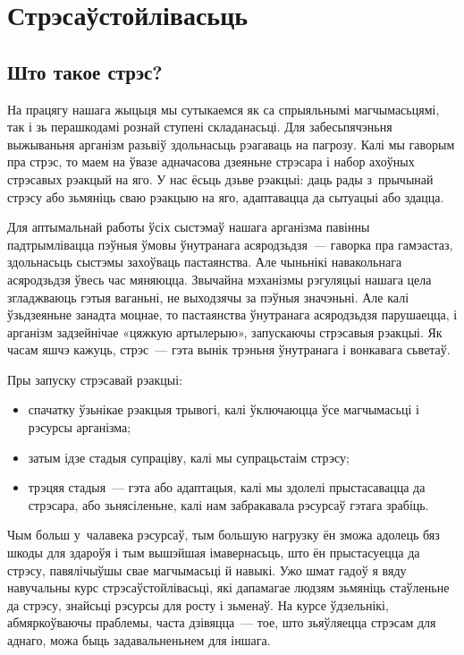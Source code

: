\chapter{Стрэсаўстойлівасьць}

\section{Што такое стрэс?}

На працягу нашага жыцьця мы сутыкаемся як са спрыяльнымі магчымасьцямі, так і зь перашкодамі рознай ступені складанасьці. Для забесьпячэньня выжываньня арганізм разьвіў здольнасьць рэагаваць на пагрозу. Калі мы гаворым пра стрэс, то маем на ўвазе адначасова дзеяньне стрэсара і набор ахоўных стрэсавых рэакцый на яго. У нас ёсьць дзьве рэакцыі: даць рады з~прычынай стрэсу або зьмяніць сваю рэакцыю на яго, адаптавацца да сытуацыі або здацца.

Для аптымальнай работы ўсіх сыстэмаў нашага арганізма павінны падтрымлівацца пэўныя ўмовы ўнутранага асяродзьдзя~--- гаворка пра гамэастаз, здольнасьць сыстэмы захоўваць пастаянства. Але чыньнікі навакольнага асяродзьдзя ўвесь час мяняюцца. Звычайна мэханізмы рэгуляцыі нашага цела згладжваюць гэтыя ваганьні, не выходзячы за пэўныя значэньні. Але калі ўзьдзеяньне занадта моцнае, то пастаянства ўнутранага асяродзьдзя парушаецца, і арганізм задзейнічае «цяжкую артылерыю», запускаючы стрэсавыя рэакцыі. Як часам яшчэ кажуць, стрэс~--- гэта вынік трэньня ўнутранага і вонкавага сьветаў.


Пры запуску стрэсавай рэакцыі: 
\begin{itemize}
  \item спачатку ўзьнікае рэакцыя трывогі, калі ўключаюцца ўсе магчымасьці і рэсурсы арганізма;
  \item затым ідзе стадыя супраціву, калі мы супрацьстаім стрэсу;
  \item трэцяя стадыя~--- гэта або адаптацыя, калі мы здолелі прыстасавацца да стрэсара, або зьнясіленьне, калі нам забракавала рэсурсаў гэтага зрабіць.
\end{itemize}

Чым больш у~чалавека рэсурсаў, тым большую нагрузку ён зможа адолець бяз шкоды для здароўя і тым вышэйшая імавернасьць, што ён прыстасуецца да стрэсу, павялічыўшы свае магчымасьці й навыкі. Ужо шмат гадоў я вяду навучальны курс стрэсаўстойлівасьці, які дапамагае людзям зьмяніць стаўленьне да стрэсу, знайсьці рэсурсы для росту і зьменаў. На курсе ўдзельнікі, абмяркоўваючы праблемы, часта дзівяцца~--- тое, што зьяўляецца стрэсам для аднаго, можа быць задавальненьнем для іншага.

